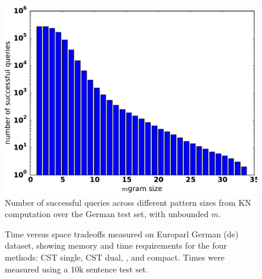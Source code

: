 \begin{figure}[tb]
\includegraphics[width=\columnwidth]{figures/german_pattern_size.pdf}
\caption{Number of successful queries across different pattern sizes from KN computation over the German test set, with unbounded $m$.}
\label{fig:germanpattern}
\end{figure}

\begin{figure}[tb]

\caption{Time versus space tradeoffs measured on Europarl German (de) dataset, showing memory and time requirements for the four methods: CST single, CST dual, \SRILM, and \SRILM compact. Times were measured using a 10k sentence test set.}
\label{fig:spacetime}
\end{figure}





